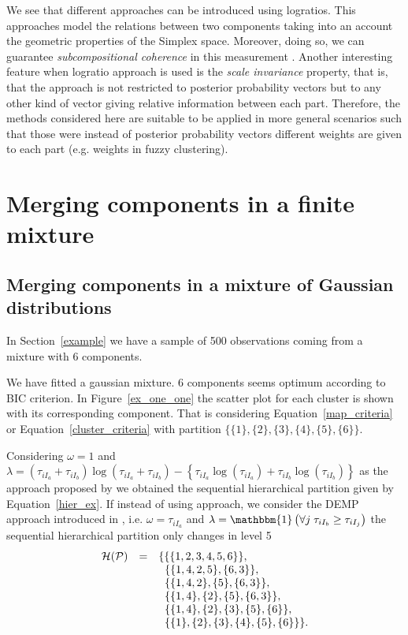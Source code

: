 \documentclass[10pt, a4paper]{article}
\begin{document}
\begin{spacing}{1.9}
We see that different approaches can be introduced using logratios. This approaches model the relations between two components taking into an account the geometric properties of the Simplex space.  Moreover, doing so, we can guarantee \emph{subcompositional coherence} in this measurement \citep{aitchison1986statistical}. Another interesting feature when logratio approach is used is the \emph{scale invariance} property, that is, that the approach is not restricted to posterior probability vectors but to any other kind of vector giving relative information between each part. Therefore, the methods considered here are suitable to be applied in more general scenarios such that those were instead of posterior probability vectors different weights are given to each part (e.g. weights in fuzzy clustering).


\section{Merging components in a finite mixture}\label{merging_examples_dist}

\subsection{Merging components in a mixture of Gaussian distributions}

In Section~\ref{example} we have a sample of 500 observations coming from a mixture with 6 components. 

We have fitted a gaussian mixture. 6 components seems optimum according to BIC criterion. In Figure~\ref{ex_one_one} the scatter plot for each cluster is shown with its corresponding component. That is considering Equation~\ref{map_criteria} or Equation~\ref{cluster_criteria} with partition $\{\{1\}, \{2\}, \{3\}, \{4\}, \{5\}, \{6\}\}$.

Considering $\omega = 1$ and $\lambda = (\tau_{iI_a}+\tau_{iI_b}) \log(\tau_{iI_a} + \tau_{iI_b}) - \left\{ \tau_{iI_a} \log(\tau_{iI_a}) + \tau_{iI_b} \log(\tau_{iI_b}) \right\}$ as the approach proposed by \cite{baudry2010combining} we obtained the sequential hierarchical partition given by Equation~\ref{hier_ex}. If instead of using \cite{baudry2010combining}  approach, we consider  the DEMP approach introduced in \citep{hennig2010methods}, i.e. $\omega = \tau_{i I_a}$ and $\lambda = \mathbbm{1}\left( \forall j\; \tau_{i I_{b}} \geq \tau_{iI_j} \right)$ the sequential hierarchical partition only changes in level 5
\begin{equation}
\begin{array}{r c l}
\mathcal{H}(\mathcal{P}) &=& \{ \{\{1, 2, 3, 4, 5, 6\}\}, \\
   & & \;\; \{ \{1, 4, 2, 5\}, \{6, 3\} \},  \\
    & & \;\; \{ \{1, 4, 2\}, \{5\}, \{6, 3\} \}, \\
   & & \;\; \{ \{1, 4\},\{2\}, \{5\}, \{6, 3\} \}, \\
   & & \;\;  \{\{1, 4\},\{2\}, \{3\},\{5\},\{6\} \},\\
   & &  \;\;  \{\{1\},\{2\},\{3\},\{4\},\{5\},\{6\}\} \}.
\end{array}
\end{equation}


\end{spacing}
\end{document}
